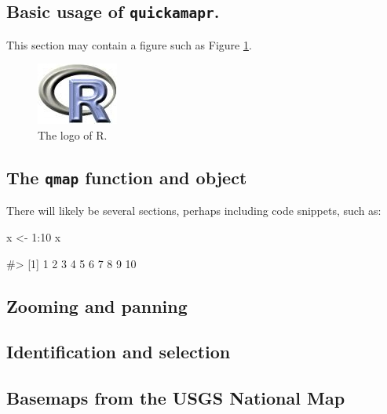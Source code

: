 \subsection{\texorpdfstring{Basic usage of
\texttt{quickamapr}.}{Basic usage of quickamapr.}}\label{basic-usage-of-quickamapr.}

This section may contain a figure such as Figure \ref{figure:rlogo}.

\begin{figure}[htbp]
  \centering
  \includegraphics{Rlogo}
  \caption{The logo of R.}
  \label{figure:rlogo}
\end{figure}

\subsection{\texorpdfstring{The \texttt{qmap} function and
object}{The qmap function and object}}\label{the-qmap-function-and-object}

There will likely be several sections, perhaps including code snippets,
such as:

\begin{Schunk}
\begin{Sinput}
x <- 1:10
x
\end{Sinput}
\begin{Soutput}
#>  [1]  1  2  3  4  5  6  7  8  9 10
\end{Soutput}
\end{Schunk}

\subsection{Zooming and panning}\label{zooming-and-panning}

\subsection{Identification and
selection}\label{identification-and-selection}

\subsection{Basemaps from the USGS National
Map}\label{basemaps-from-the-usgs-national-map}

